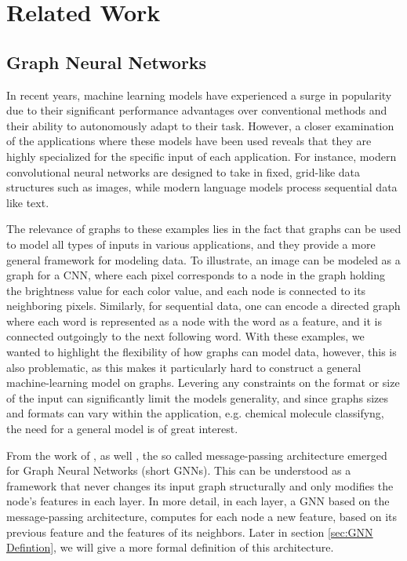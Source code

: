 \documentclass[11pt, dvipsnames, DIV=12]{scrreprt}
\theoremstyle{definition}
\begin{document}
\section{Related Work}
\subsection{Graph Neural Networks}
In recent years, machine learning models have experienced a surge in popularity due to their significant performance advantages over conventional methods and their ability to autonomously adapt to their task. However, a closer examination of the applications where these models have been used reveals that they are highly specialized for the specific input of each application. For instance, modern convolutional neural networks are designed to take in fixed, grid-like data structures such as images, while modern language models process sequential data like text.

The relevance of graphs to these examples lies in the fact that graphs can be used to model all types of inputs in various applications, and they provide a more general framework for modeling data. To illustrate, an image can be modeled as a graph for a CNN, where each pixel corresponds to a node in the graph holding the brightness value for each color value, and each node is connected to its neighboring pixels. Similarly, for sequential data, one can encode a directed graph where each word is represented as a node with the word as a feature, and it is connected outgoingly to the next following word. With these examples, we wanted to highlight the flexibility of how graphs can model data, however, this is also problematic, as this makes it particularly hard to construct a general machine-learning model on graphs. Levering any constraints on the format or size of the input can significantly limit the models generality, and since graphs sizes and formats can vary within the application, e.g. chemical molecule classifyng, the need for a general model is of great interest.

From the work of \cite{Gil+2017}, as well \cite{Sca+2009}, the so called message-passing architecture emerged for Graph Neural Networks (short GNNs). This can be understood as a framework that never changes its input graph structurally and only modifies the node's features in each layer. In more detail, in each layer, a GNN based on the message-passing architecture, computes for each node a new feature, based on its previous feature and the features of its neighbors. Later in section \ref{sec:GNN Defintion}, we will give a more formal definition of this architecture.
\end{document}
